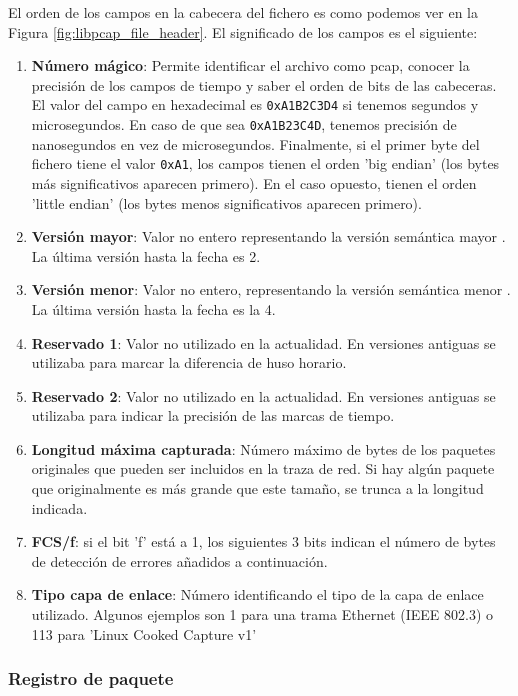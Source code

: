 El orden de los campos en la cabecera del fichero es como podemos ver en la Figura \ref{fig:libpcap_file_header}. El significado de los campos es el siguiente:

\begin{enumerate}
    \item \textbf{Número mágico}: Permite identificar el archivo como pcap, conocer la precisión de los campos de tiempo y saber el orden de bits de las cabeceras. El valor del campo en hexadecimal es \texttt{0xA1B2C3D4} si tenemos segundos y microsegundos. En caso de que sea \texttt{0xA1B23C4D}, tenemos precisión de nanosegundos en vez de microsegundos. Finalmente, si el primer byte del fichero tiene el valor \texttt{0xA1}, los campos tienen el orden 'big endian' (los bytes más significativos aparecen primero). En el caso opuesto, tienen el orden 'little endian' (los bytes menos significativos aparecen primero).
    \item \textbf{Versión mayor}: Valor no entero representando la versión semántica mayor \cite{preston2013semantic}. La última versión hasta la fecha es 2.
    \item \textbf{Versión menor}: Valor no entero, representando la versión semántica menor \cite{preston2013semantic}. La última versión hasta la fecha es la 4.
    \item \textbf{Reservado 1}: Valor no utilizado en la actualidad. En versiones antiguas se utilizaba para marcar la diferencia de huso horario.
    \item \textbf{Reservado 2}: Valor no utilizado en la actualidad. En versiones antiguas se utilizaba para indicar la precisión de las marcas de tiempo.
    \item \textbf{Longitud máxima capturada}: Número máximo de bytes de los paquetes originales que pueden ser incluidos en la traza de red. Si hay algún paquete que originalmente es más grande que este tamaño, se trunca a la longitud indicada.    \item \textbf{FCS/f}: si el bit 'f' está a 1, los siguientes 3 bits indican el número de bytes de detección de errores añadidos a continuación. 
    \item \textbf{Tipo capa de enlace}: Número identificando el tipo de la capa de enlace utilizado. Algunos ejemplos son 1 para una trama Ethernet (IEEE 802.3) o 113 para 'Linux Cooked Capture v1' \cite{linktypetcpdump}
\end{enumerate}

\subsubsection{Registro de paquete}

